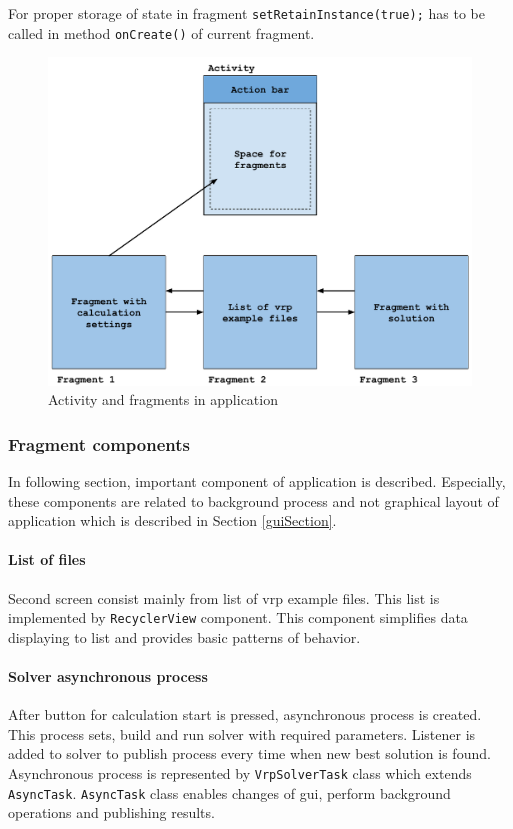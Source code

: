 For proper storage of state in fragment \texttt{setRetainInstance(true);} has to be called in method \texttt{onCreate()}
of current fragment.

\begin{figure}[h!]
    \centering
    \includegraphics[scale=0.7]{fig/act_frag.pdf}
    \caption{Activity and fragments in application}
    \label{activityFragment}
\end{figure}

\subsubsection{Fragment components}
In following section, important component of application is described. Especially, these components are related to
background process and not graphical layout of application which is described in Section \ref{guiSection}.

\paragraph{List of files}
Second screen consist mainly from list of vrp example files. This list is implemented by \texttt{RecyclerView}
component. This component simplifies data displaying to list and provides basic patterns of behavior.

\paragraph{Solver asynchronous process}
After button for calculation start is pressed, asynchronous process is created. This process sets, build and run solver
with required parameters. Listener is added to solver to publish process every time when new best solution is found.
Asynchronous process is represented by \texttt{VrpSolverTask} class which extends \texttt{AsyncTask}. \texttt{AsyncTask}
class enables changes of gui, perform background operations and publishing results.

